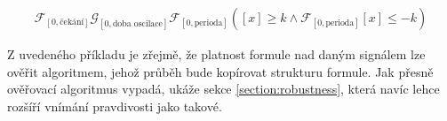 \begin{align}\label{eq:stl:lotkav:oscil}
\mathcal{F}_{[0, \textrm{čekání}]}\mathcal{G}_{[0, \textrm{doba oscilace}]}\mathcal{F}_{[0, \textrm{perioda}]}([x] \geq k \wedge \mathcal{F}_{[0, \textrm{perioda}]}[x] \leq -k)
\end{align}

Z uvedeného příkladu je zřejmě, že platnost formule nad daným signá\-lem
lze ověřit algoritmem, jehož průběh bude kopírovat strukturu formule. Jak
přesně ověřovací algoritmus vypadá, ukáže sekce \ref{section:robustness},
která navíc lehce rozšíří vnímání pravdivosti jako takové.

